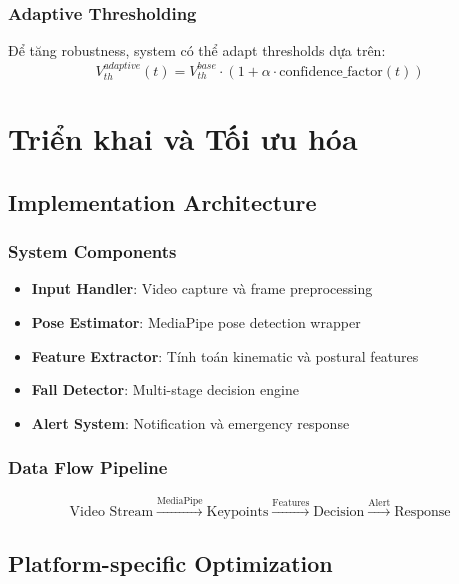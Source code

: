 \subsubsection{Adaptive Thresholding}
Để tăng robustness, system có thể adapt thresholds dựa trên:
\begin{equation}
V_{th}^{adaptive}(t) = V_{th}^{base} \cdot (1 + \alpha \cdot \text{confidence\_factor}(t))
\end{equation}

\section{Triển khai và Tối ưu hóa}

\subsection{Implementation Architecture}

\subsubsection{System Components}
\begin{itemize}
    \item \textbf{Input Handler}: Video capture và frame preprocessing
    \item \textbf{Pose Estimator}: MediaPipe pose detection wrapper
    \item \textbf{Feature Extractor}: Tính toán kinematic và postural features
    \item \textbf{Fall Detector}: Multi-stage decision engine
    \item \textbf{Alert System}: Notification và emergency response
\end{itemize}

\subsubsection{Data Flow Pipeline}
\begin{equation}
\text{Video Stream} \xrightarrow{\text{MediaPipe}} \text{Keypoints} \xrightarrow{\text{Features}} \text{Decision} \xrightarrow{\text{Alert}} \text{Response}
\end{equation}

\subsection{Platform-specific Optimization}

